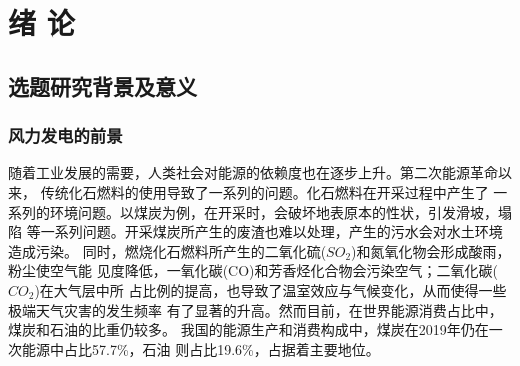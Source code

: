 \documentclass[AutoFakeBold]{LZUThesis}
\begin{document}
\tableofcontents

%
\begingroup
{}
\renewcommand{\addvspace}[1]{}
\newcommand{\loflabel}{图} 
\renewcommand{\numberline}[1]{\loflabel~#1\hspace*{1em}}
\listoffigures
\thispagestyle{empty}

\newcommand{\lotlabel}{表}
\renewcommand{\numberline}[1]{\lotlabel~#1\hspace*{1em}}
\listoftables
\thispagestyle{empty}
\clearpage
\endgroup
%

\mainmatter

\chapter{绪 \qquad 论}


\section{选题研究背景及意义}
\subsection{风力发电的前景}
随着工业发展的需要，人类社会对能源的依赖度也在逐步上升。第二次能源革命以来，
传统化石燃料的使用导致了一系列的问题。化石燃料在开采过程中产生了
一系列的环境问题。以煤炭为例，在开采时，会破坏地表原本的性状，引发滑坡，塌陷
等一系列问题。开采煤炭所产生的废渣也难以处理，产生的污水会对水土环境造成污染。
同时，燃烧化石燃料所产生的二氧化硫($SO_2$)和氮氧化物会形成酸雨，粉尘使空气能
见度降低，一氧化碳(CO)和芳香烃化合物会污染空气；二氧化碳($CO_2$)在大气层中所
占比例的提高，也导致了温室效应与气候变化，从而使得一些极端天气灾害的发生频率
有了显著的升高。然而目前，在世界能源消费占比中，煤炭和石油的比重仍较多。
我国的能源生产和消费构成中，煤炭在2019年仍在一次能源中占比57.7\%，石油
则占比19.6\%，占据着主要地位。
\end{document}
